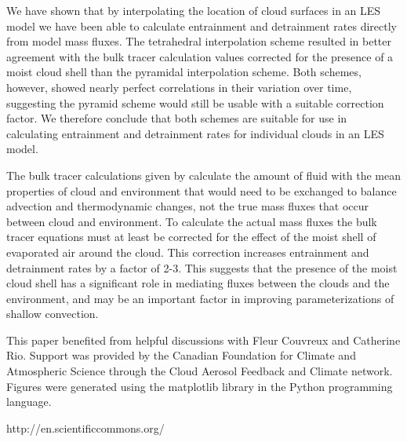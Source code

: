 \documentclass[12pt]{article}
\begin{document}
We have shown that by interpolating the location of cloud surfaces in an LES
model we have been able to calculate entrainment and detrainment rates directly 
from model mass fluxes.  The tetrahedral interpolation scheme resulted in
better agreement with the bulk tracer calculation values corrected for the 
presence of a moist cloud shell than the pyramidal interpolation scheme.  Both 
schemes, however, showed nearly perfect correlations in their variation over 
time, suggesting the pyramid scheme would still be usable with a suitable 
correction factor.  We therefore conclude that both schemes are suitable for 
use in calculating entrainment and detrainment rates for individual clouds in 
an LES model.

The bulk tracer calculations given by \cite{Siebesma1995} calculate the amount
of fluid with the mean properties of cloud and environment that would need to
be exchanged to balance advection and thermodynamic changes, not the true mass
fluxes that occur between cloud and environment.  To calculate the actual mass
fluxes the bulk tracer equations must at least be corrected for the effect of
the moist shell of evaporated air around the cloud.  This correction increases
entrainment and detrainment rates by a factor of 2-3.  This suggests that the
presence of the moist cloud shell has a significant role in mediating fluxes
between the clouds and the environment, and may be an important factor in 
improving parameterizations of shallow convection.



\begin{acknowledgment}
This paper benefited from helpful discussions with Fleur Couvreux and Catherine Rio.
Support was provided by the Canadian Foundation for Climate and Atmospheric
Science through the Cloud Aerosol Feedback and Climate network.
Figures were generated using the matplotlib library in the Python
programming language.
\end{acknowledgment}
http://en.scientificcommons.org/
\end{document}
